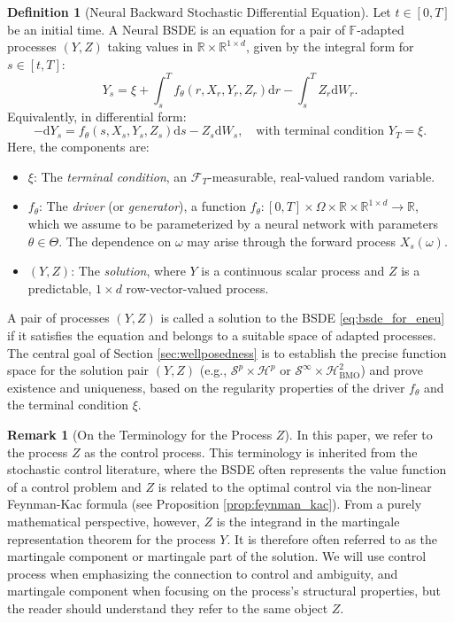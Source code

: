 \documentclass[qian]{imsart}
\newcommand{\R}{\mathbb{R}}
\newcommand{\Fcal}{\mathcal{F}}
\newcommand{\dd}{\mathrm{d}}
\theoremstyle{plain}
\theoremstyle{definition}
\newtheorem{definition}[theorem]{Definition}
\newtheorem{remark}[theorem]{Remark}
\begin{document}
\begin{definition}[Neural Backward Stochastic Differential Equation]
\label{def:neural_bsde}
Let $t \in [0,T]$ be an initial time. A Neural BSDE is an equation for a pair of $\mathbb{F}$-adapted processes $(Y,Z)$ taking values in $\R \times \R^{1 \times d}$, given by the integral form for $s \in [t,T]$:
\begin{equation}
\label{eq:bsde_for_eneu}
    Y_s = \xi + \int_s^T f_\theta(r, X_r, Y_r, Z_r) \dd r - \int_s^T Z_r \dd W_r.
\end{equation}
Equivalently, in differential form:
\begin{equation}
\label{eq:bsde_for_eneu_diff}
    - \dd Y_s = f_\theta(s, X_s, Y_s, Z_s) \dd s - Z_s \dd W_s, \quad \text{with terminal condition } Y_T = \xi.
\end{equation}
Here, the components are:
\begin{itemize}
    \item $\xi$: The \textit{terminal condition}, an $\Fcal_T$-measurable, real-valued random variable.
    \item $f_\theta$: The \textit{driver} (or \textit{generator}), a function $f_\theta: [0,T] \times \Omega \times \R \times \R^{1 \times d} \to \R$, which we assume to be parameterized by a neural network with parameters $\theta \in \Theta$. The dependence on $\omega$ may arise through the forward process $X_s(\omega)$.
    \item $(Y,Z)$: The \textit{solution}, where $Y$ is a continuous scalar process and $Z$ is a predictable, $1 \times d$ row-vector-valued process.
\end{itemize}
A pair of processes $(Y,Z)$ is called a solution to the BSDE \eqref{eq:bsde_for_eneu} if it satisfies the equation and belongs to a suitable space of adapted processes. The central goal of Section \ref{sec:wellposedness} is to establish the precise function space for the solution pair $(Y,Z)$ (e.g., $\mathcal{S}^p \times \mathcal{H}^p$ or $\mathcal{S}^\infty \times \mathcal{H}^2_{\mathrm{BMO}}$) and prove existence and uniqueness, based on the regularity properties of the driver $f_\theta$ and the terminal condition $\xi$.
\end{definition}

\begin{remark}[On the Terminology for the Process $Z$]
\label{rem:z_terminology}
In this paper, we refer to the process $Z$ as the control process. This terminology is inherited from the stochastic control literature, where the BSDE often represents the value function of a control problem and $Z$ is related to the optimal control via the non-linear Feynman-Kac formula (see Proposition \ref{prop:feynman_kac}). From a purely mathematical perspective, however, $Z$ is the integrand in the martingale representation theorem for the process $Y$. It is therefore often referred to as the martingale component or martingale part of the solution. We will use control process when emphasizing the connection to control and ambiguity, and martingale component when focusing on the process's structural properties, but the reader should understand they refer to the same object $Z$.
\end{remark}
\end{document}
